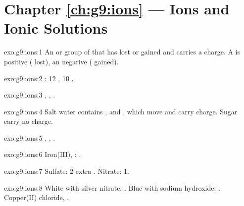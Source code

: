 \section*{Chapter \ref{ch:g9:ions} --- Ions and Ionic Solutions}

\begin{solution}{exo:g9:ions:1}
An  or group of  that has lost or gained  and carries a
charge. A  is positive ( lost), an  negative
( gained).
\end{solution}

\begin{solution}{exo:g9:ions:2}
: 12 , 10 .
\end{solution}

\begin{solution}{exo:g9:ions:3}
, , .
\end{solution}

\begin{solution}{exo:g9:ions:4}
Salt water contains ,  and , which move and
carry charge. Sugar  carry no charge.
\end{solution}

\begin{solution}{exo:g9:ions:5}
, , .
\end{solution}

\begin{solution}{exo:g9:ions:6}
Iron(III), : .
\end{solution}

\begin{solution}{exo:g9:ions:7}
Sulfate: 2 extra . Nitrate: 1.
\end{solution}

\begin{solution}{exo:g9:ions:8}
White with silver nitrate: . Blue with sodium hydroxide:
. Copper(II) chloride, .
\end{solution}

